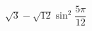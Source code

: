 \begin{ex}[type=calculate]
	\begin{condition}
		\( \sqrt{3}-\sqrt{12}\sin^2\dfrac{5\pi}{12} \)
	\end{condition}
\end{ex}
